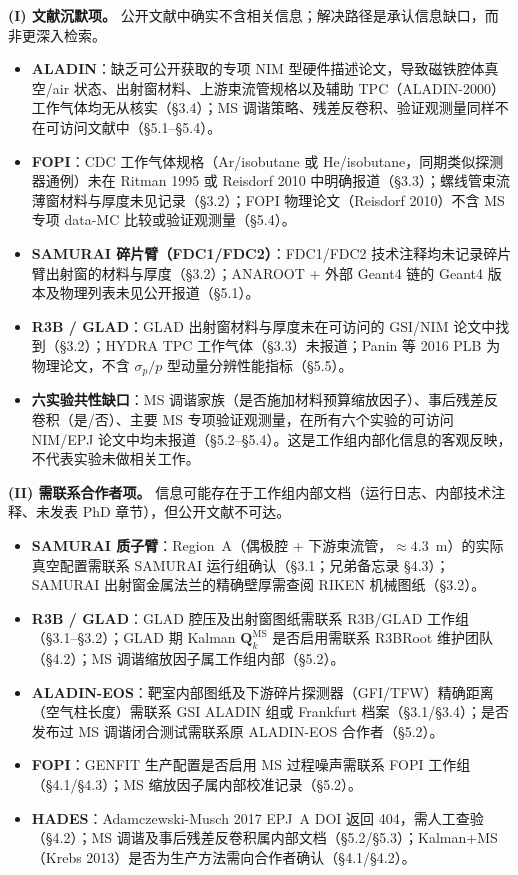 \documentclass[a4paper, 11pt]{article}
\begin{document}
\textbf{(I) 文献沉默项。}
公开文献中确实不含相关信息；解决路径是承认信息缺口，而非更深入检索。
\begin{itemize}[leftmargin=2em,itemsep=1pt]
  \item \textbf{ALADIN}：缺乏可公开获取的专项 NIM 型硬件描述论文，导致磁铁腔体真空/air 状态、出射窗材料、上游束流管规格以及辅助 TPC（ALADIN-2000）工作气体均无从核实（§3.4）；MS 调谐策略、残差反卷积、验证观测量同样不在可访问文献中（§5.1--§5.4）。
  \item \textbf{FOPI}：CDC 工作气体规格（Ar/isobutane 或 He/isobutane，同期类似探测器通例）未在 Ritman 1995 或 Reisdorf 2010 中明确报道（§3.3）；螺线管束流薄窗材料与厚度未见记录（§3.2）；FOPI 物理论文（Reisdorf 2010）不含 MS 专项 data-MC 比较或验证观测量（§5.4）。
  \item \textbf{SAMURAI 碎片臂（FDC1/FDC2）}：FDC1/FDC2 技术注释均未记录碎片臂出射窗的材料与厚度（§3.2）；ANAROOT + 外部 Geant4 链的 Geant4 版本及物理列表未见公开报道（§5.1）。
  \item \textbf{R3B / GLAD}：GLAD 出射窗材料与厚度未在可访问的 GSI/NIM 论文中找到（§3.2）；HYDRA TPC 工作气体（§3.3）未报道；Panin 等 2016 PLB 为物理论文，不含 $\sigma_p/p$ 型动量分辨性能指标（§5.5）。
  \item \textbf{六实验共性缺口}：MS 调谐家族（是否施加材料预算缩放因子）、事后残差反卷积（是/否）、主要 MS 专项验证观测量，在所有六个实验的可访问 NIM/EPJ 论文中均未报道（§5.2--§5.4）。这是工作组内部化信息的客观反映，不代表实验未做相关工作。
\end{itemize}

\textbf{(II) 需联系合作者项。}
信息可能存在于工作组内部文档（运行日志、内部技术注释、未发表 PhD 章节），但公开文献不可达。
\begin{itemize}[leftmargin=2em,itemsep=1pt]
  \item \textbf{SAMURAI 质子臂}：Region~A（偶极腔 + 下游束流管，$\approx 4.3$~m）的实际真空配置需联系 SAMURAI 运行组确认（§3.1；兄弟备忘录 §4.3）；SAMURAI 出射窗金属法兰的精确壁厚需查阅 RIKEN 机械图纸（§3.2）。
  \item \textbf{R3B / GLAD}：GLAD 腔压及出射窗图纸需联系 R3B/GLAD 工作组（§3.1--§3.2）；GLAD 期 Kalman $\mathbf{Q}_k^{\mathrm{MS}}$ 是否启用需联系 R3BRoot 维护团队（§4.2）；MS 调谐缩放因子属工作组内部（§5.2）。
  \item \textbf{ALADIN-EOS}：靶室内部图纸及下游碎片探测器（GFI/TFW）精确距离（空气柱长度）需联系 GSI ALADIN 组或 Frankfurt 档案（§3.1/§3.4）；是否发布过 MS 调谐闭合测试需联系原 ALADIN-EOS 合作者（§5.2）。
  \item \textbf{FOPI}：GENFIT 生产配置是否启用 MS 过程噪声需联系 FOPI 工作组（§4.1/§4.3）；MS 缩放因子属内部校准记录（§5.2）。
  \item \textbf{HADES}：Adamczewski-Musch 2017 EPJ~A DOI 返回 404，需人工查验（§4.2）；MS 调谐及事后残差反卷积属内部文档（§5.2/§5.3）；Kalman+MS（Krebs 2013）是否为生产方法需向合作者确认（§4.1/§4.2）。
\end{itemize}
\end{document}

